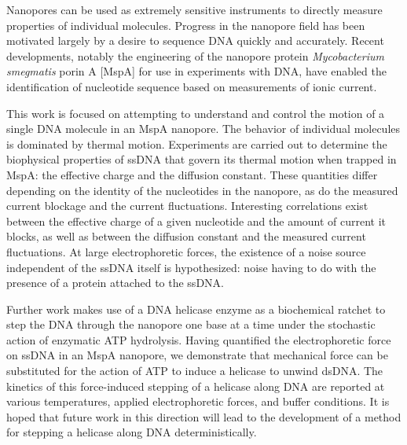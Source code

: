 
Nanopores can be used as extremely sensitive instruments to directly measure properties of individual molecules.  Progress in the nanopore field has been motivated largely by a desire to sequence DNA quickly and accurately.  Recent developments, notably the engineering of the nanopore protein \textit{Mycobacterium smegmatis} porin A [MspA] for use in experiments with DNA, have enabled the identification of nucleotide sequence based on measurements of ionic current.

This work is focused on attempting to understand and control the motion of a single DNA molecule in an MspA nanopore.  The behavior of individual molecules is dominated by thermal motion.  Experiments are carried out to determine the biophysical properties of ssDNA that govern its thermal motion when trapped in MspA: the effective charge and the diffusion constant.  These quantities differ depending on the identity of the nucleotides in the nanopore, as do the measured current blockage and the current fluctuations.  Interesting correlations exist between the effective charge of a given nucleotide and the amount of current it blocks, as well as between the diffusion constant and the measured current fluctuations.  At large electrophoretic forces, the existence of a noise source independent of the ssDNA itself is hypothesized: noise having to do with the presence of a protein attached to the ssDNA.

Further work makes use of a DNA helicase enzyme as a biochemical ratchet to step the DNA through the nanopore one base at a time under the stochastic action of enzymatic ATP hydrolysis.  Having quantified the electrophoretic force on ssDNA in an MspA nanopore, we demonstrate that mechanical force can be substituted for the action of ATP to induce a helicase to unwind dsDNA.  The kinetics of this force-induced stepping of a helicase along DNA are reported at various temperatures, applied electrophoretic forces, and buffer conditions.  It is hoped that future work in this direction will lead to the development of a method for stepping a helicase along DNA deterministically.
